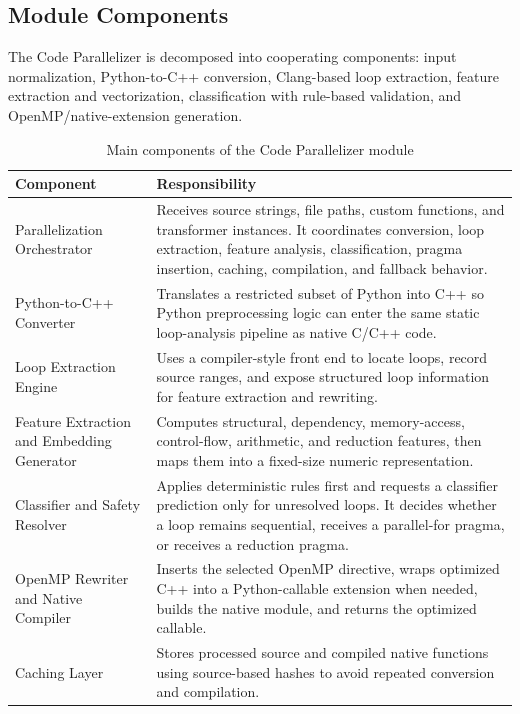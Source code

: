 \documentclass[12pt,a4paper,oneside]{report}
\begin{document}
\newpage
\subsection{Module Components}

The Code Parallelizer is decomposed into cooperating components: input
normalization, Python-to-C++ conversion, Clang-based loop extraction, feature
extraction and vectorization, classification with rule-based validation, and
OpenMP/native-extension generation.

\begin{table}[H]
\centering
\normalsize
\setlength{\tabcolsep}{5pt}
\renewcommand{\arraystretch}{0.88}
\caption{Main components of the Code Parallelizer module}
\label{tab:parallelizer-components}
\begin{tabular}{p{}p{}}
\toprule
\textbf{Component} & \textbf{Responsibility} \\
\midrule
Parallelization Orchestrator &
Receives source strings, file paths, custom functions, and transformer instances.
It coordinates conversion, loop extraction, feature analysis, classification,
pragma insertion, caching, compilation, and fallback behavior. \\
\midrule
Python-to-C++ Converter &
Translates a restricted subset of Python into C++ so Python preprocessing logic
can enter the same static loop-analysis pipeline as native C/C++ code. \\
\midrule
Loop Extraction Engine &
Uses a compiler-style front end to locate loops, record source ranges, and expose
structured loop information for feature extraction and rewriting. \\
\midrule
Feature Extraction and Embedding Generator &
Computes structural, dependency, memory-access, control-flow, arithmetic, and
reduction features, then maps them into a fixed-size numeric representation. \\
\midrule
Classifier and Safety Resolver &
Applies deterministic rules first and requests a classifier prediction only for
unresolved loops. It decides whether a loop remains sequential, receives a
parallel-for pragma, or receives a reduction pragma. \\
\midrule
OpenMP Rewriter and Native Compiler &
Inserts the selected OpenMP directive, wraps optimized C++ into a Python-callable
extension when needed, builds the native module, and returns the optimized
callable. \\
\midrule
Caching Layer &
Stores processed source and compiled native functions using source-based hashes
to avoid repeated conversion and compilation. \\
\bottomrule
\end{tabular}
\end{table}
\end{document}
